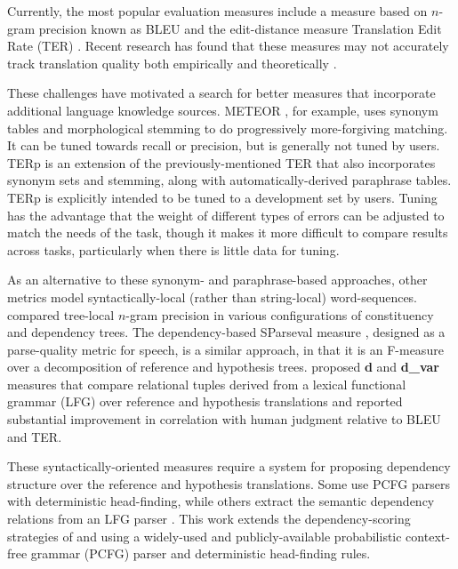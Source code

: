 \documentclass{kluwer}    %
\begin{document}
\begin{article}
Currently, the most popular evaluation measures include a measure
based on $n$-gram precision known as BLEU \cite{papineni02bleu} and
the edit-distance measure Translation Edit Rate (TER)
\cite{snover06ter}.  Recent research has found that these measures may
not accurately track translation quality both empirically
\cite{charniak03syntaxlmmt} and theoretically
\cite{callisonburch06bleuproblems}.

These challenges have motivated a search for better measures that
incorporate additional language knowledge sources.  METEOR
\cite{banerjee05meteor}, for example, uses synonym tables and
morphological stemming to do progressively more-forgiving matching.
It can be tuned towards recall or precision, but is generally not
tuned by users.  TERp \cite{snover09terp} is an extension of the
previously-mentioned TER that also incorporates synonym sets and stemming, along
with automatically-derived paraphrase tables.  TERp is explicitly
intended to be tuned to a development set by users.
%
Tuning has the advantage that the weight of different types of errors
can be adjusted to match the needs of the task, though it makes it
more difficult to compare results across tasks, particularly when
there is little data for tuning.

As an alternative to these synonym- and paraphrase-based approaches,
other metrics model syntactically-local (rather than string-local)
word-sequences.  compared tree-local
$n$-gram precision in various configurations of constituency and
dependency trees.  The dependency-based SParseval measure
\cite{roark06:sparseval}, designed as a parse-quality metric for
speech, is a similar approach, in that it is an F-measure over a
decomposition of reference and hypothesis trees.
 proposed \textbf{d} and
\textbf{d\_var} measures that compare relational tuples derived from a
lexical functional grammar (LFG)
over reference and hypothesis translations and reported substantial
improvement in correlation with human judgment relative to BLEU and
TER.

These syntactically-oriented measures require a system for proposing
dependency structure over the reference and hypothesis
translations. Some \cite{liu05syntaxformteval,roark06:sparseval} use
PCFG parsers with deterministic head-finding, while others
\cite{owczarzak07labelleddepseval} extract the semantic dependency
relations from an LFG parser \cite{cahill04lfg}.
%
This work extends the dependency-scoring strategies of
 and
 using a widely-used and
publicly-available probabilistic context-free grammar (PCFG) parser and deterministic head-finding rules.
 

\end{article}
\end{document}
